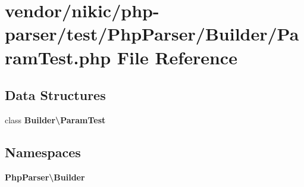 \section{vendor/nikic/php-\/parser/test/\+Php\+Parser/\+Builder/\+Param\+Test.php File Reference}
\label{_param_test_8php}
\subsection*{Data Structures}
\begin{DoxyCompactItemize}
\item 
class {\bf Builder\textbackslash{}\+Param\+Test}
\end{DoxyCompactItemize}
\subsection*{Namespaces}
\begin{DoxyCompactItemize}
\item 
 {\bf Php\+Parser\textbackslash{}\+Builder}
\end{DoxyCompactItemize}
